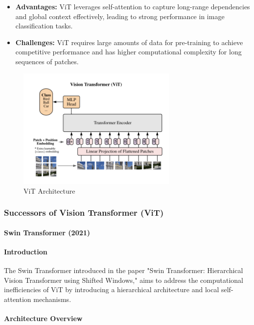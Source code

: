 \documentclass[12pt]{article}
\begin{document}
\begin{itemize}
    \item \textbf{Advantages:} ViT leverages self-attention to capture long-range dependencies and global context effectively, leading to strong performance in image classification tasks.
    \item \textbf{Challenges:} ViT requires large amounts of data for pre-training to achieve competitive performance and has higher computational complexity for long sequences of patches.
\end{itemize}

\begin{figure}[h]
    \centering
    \includegraphics[width=0.7\textwidth]{./media/vit.png}
    \caption{ViT Architecture}
    \label{fig:vit}
\end{figure}

\subsubsection{Successors of Vision Transformer (ViT)}

\paragraph{Swin Transformer (2021)}

\paragraph{Introduction}

The Swin Transformer introduced in the paper "Swin Transformer: Hierarchical Vision Transformer using Shifted Windows," aims to address the computational inefficiencies of ViT by introducing a hierarchical architecture and local self-attention mechanisms.

\paragraph{Architecture Overview}
\end{document}
